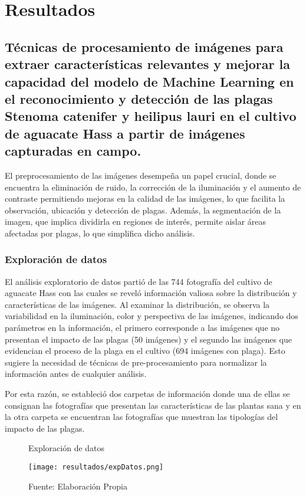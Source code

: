 \section{Resultados}

\subsection{Técnicas de procesamiento de imágenes para extraer características relevantes y mejorar la capacidad del modelo de Machine Learning en el reconocimiento y detección de las plagas Stenoma catenifer y heilipus lauri en el cultivo de aguacate Hass a partir de imágenes capturadas en campo.}

El preprocesamiento de las imágenes desempeña un papel crucial, donde se encuentra la eliminación de ruido, la corrección de la iluminación y el aumento de contraste permitiendo mejoras en la calidad de las imágenes, lo que facilita la observación, ubicación y detección de plagas. Además, la segmentación de la imagen, que implica dividirla en regiones de interés, permite aislar áreas afectadas por plagas, lo que simplifica dicho análisis.


\subsubsection{Exploración de datos}

El análisis exploratorio de datos partió de las 744 fotografía del cultivo de aguacate Hass con las cuales se reveló información valiosa sobre la distribución y características de las imágenes. Al examinar la distribución, se observa la variabilidad en la iluminación, color y perspectiva de las imágenes, indicando dos parámetros en la información, el primero corresponde a las imágenes que no presentan el impacto de las plagas (50 imágenes) y el segundo las imágenes que evidencian el proceso de la plaga en el cultivo (694 imágenes con plaga). Esto sugiere la necesidad de técnicas de pre-procesamiento para normalizar la información antes de cualquier análisis.

Por esta razón, se estableció dos carpetas de información donde una de ellas se consignan las fotografías que presentan las características de las plantas sana y en la otra carpeta se encuentran las fotografías que muestran las tipologías del impacto de las plagas.

\newpage

\begin{figure}[h]
\centering
\caption{Exploración de datos}
\texttt{[image: resultados/expDatos.png]}
\caption*{\footnotesize Fuente: Elaboración Propia}
\label{fig:figuraExpDatos}
\end{figure}


